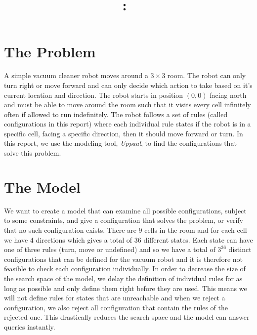 \documentclass{article}
\title{
\vspace{2in}
\textmd{\textbf{\hmwkClass:\ \hmwkTitle}}\\
\vspace{0.1in}\large{\textit{\hmwkClassInstructor}}
\vspace{3in}
}
\author{\textbf{\hmwkAuthorName}}
\date{} %
\begin{document}
\maketitle



\newpage



\section{The Problem}
    A simple vacuum cleaner robot moves around a $3\times3$ room. The robot can only turn right or move forward and can only decide which action to take based on it's current location and direction. The robot starts in position $(0,0)$ facing north and must be able to move around the room such that it visits every cell infinitely often if allowed to run indefinitely. The robot follows a set of rules (called configurations in this report) where each individual rule states if the robot is in a specific cell, facing a specific direction, then it should move forward or turn. In this report, we use the modeling tool, \textit{Uppaal}, to find the configurations that solve this problem.

\section{The Model}
    We want to create a model that can examine all possible configurations, subject to some constraints, and give a configuration that solves the problem, or verify that no such configuration exists. There are 9 cells in the room and for each cell we have 4 directions which gives a total of 36 different states. Each state can have one of three rules (turn, move or undefined) and so we have a total of $3^{36}$ distinct configurations that can be defined for the vacuum robot and it is therefore not feasible to check each configuration individually. In order to decrease the size of the search space of the model, we delay the definition of individual rules for as long as possible and only define them right before they are used. This means we will not define rules for states that are unreachable and when we reject a configuration, we also reject all configuration that contain the rules of the rejected one. This drastically reduces the search space and the model can answer queries instantly.
\end{document}
